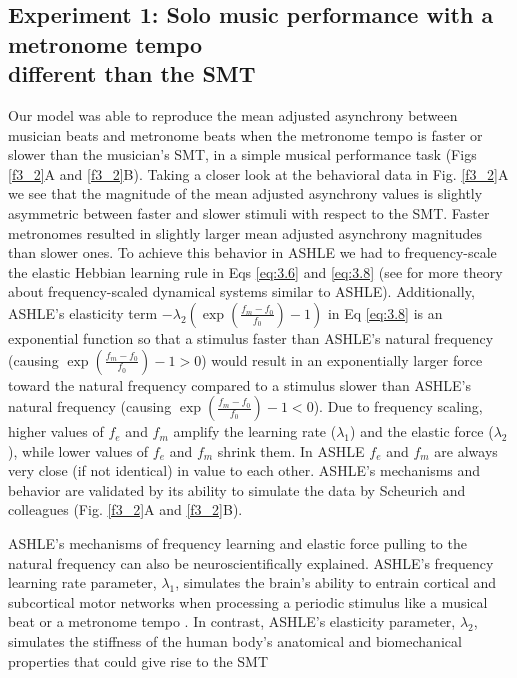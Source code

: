 \documentclass{report}
\begin{document}
\subsection{Experiment 1: Solo music performance with a metronome tempo \\ different than the SMT}

Our model was able to reproduce the mean adjusted asynchrony between musician beats and metronome beats when the metronome tempo is faster or slower than the musician's SMT, in a simple musical performance task (Figs \ref{f3_2}A and \ref{f3_2}B). Taking a closer look at the behavioral data in Fig.{} \ref{f3_2}A we see that the magnitude of the mean adjusted asynchrony values is slightly asymmetric between faster and slower stimuli with respect to the SMT. Faster metronomes resulted in slightly larger mean adjusted asynchrony magnitudes than slower ones. To achieve this behavior in ASHLE we had to frequency-scale the elastic Hebbian learning rule in Eqs \eqref{eq:3.6} and \eqref{eq:3.8} (see \cite{kim2015signal, large2010canonical} for more theory about frequency-scaled dynamical systems similar to ASHLE). Additionally, ASHLE's elasticity term $-\lambda_2\left(\exp\left(\frac{f_m-f_0}{f_0}\right)-1\right)$ in Eq \eqref{eq:3.8} is an exponential function so that a stimulus faster than ASHLE's natural frequency (causing $\exp\left(\frac{f_m-f_0}{f_0}\right)-1>0$) would result in an exponentially larger force toward the natural frequency compared to a stimulus slower than ASHLE's natural frequency (causing $\exp\left(\frac{f_m-f_0}{f_0}\right)-1<0$). Due to frequency scaling, higher values of $f_e$ and $f_m$ amplify the learning rate ($\lambda_1$) and the elastic force ($\lambda_2$), while lower values of $f_e$ and $f_m$ shrink them. In ASHLE $f_e$ and $f_m$ are always very close (if not identical) in value to each other. ASHLE's mechanisms and behavior are validated by its ability to simulate the data by Scheurich and colleagues \cite{scheurich2018tapping} (Fig.{} \ref{f3_2}A and \ref{f3_2}B).

ASHLE's mechanisms of frequency learning and elastic force pulling to the natural frequency can also be neuroscientifically explained. ASHLE's frequency learning rate parameter, $\lambda_1$, simulates the brain's ability to entrain cortical and subcortical motor networks when processing a periodic stimulus like a musical beat or a metronome tempo \cite{large2015neural}. In contrast, ASHLE's elasticity parameter, $\lambda_2$, simulates the stiffness of the human body's anatomical and biomechanical properties that could give rise to the SMT \cite{goodman2000advantages}
\end{document}
